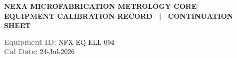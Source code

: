 \documentclass[10pt,a4paper]{scrartcl}
\newcommand{\fieldlabel}[1]{\textcolor{SlateGrey}{\small\bfseries #1}}
\newcommand{\fieldval}[1]{{\small #1}}
\begin{document}
\begin{tcolorbox}[headerbox]
\begin{minipage}[c]{0.65\textwidth}
  {\large \textbf{\textcolor{NavyDark}{NEXA MICROFABRICATION METROLOGY CORE}}}\\[2pt]
  {\small \textbf{\textcolor{CleanroomBlue}{EQUIPMENT CALIBRATION RECORD ~|~ CONTINUATION SHEET}}}
\end{minipage}%
\begin{minipage}[c]{0.35\textwidth}
  \begin{flushright}
    {\small \fieldlabel{Equipment ID:} \fieldval{NFX-EQ-ELL-094}}\\[2pt]
    {\small \fieldlabel{Cal Date:} \fieldval{24-Jul-2026}}
  \end{flushright}
\end{minipage}
\end{tcolorbox}

\vspace{1pt}
\end{document}
